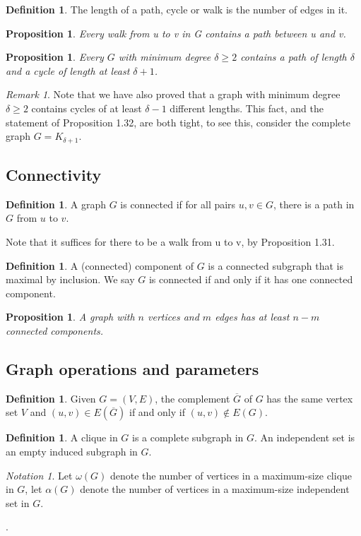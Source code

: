 \documentclass[10pt, fleqn, a4paper, landscape]{article}
\theoremstyle{plain} %
\newtheorem{pro}[thm]{Proposition}
\theoremstyle{remark} %
\newtheorem{rem}[thm]{Remark}
\newtheorem{nota}[thm]{Notation}
\theoremstyle{definition} %
\newtheorem{defi}[thm]{Definition}
\begin{document}
\begin{multicols}{3}
\begin{tiny}
\begin{defi}
The length of a path, cycle or walk is the number of edges in it.
\end{defi}
\addtocounter{thm}{1}
\begin{pro}
Every walk from u to v in G contains a path between u and v.
\end{pro}

\begin{pro}
Every $G$ with minimum degree $ \delta\ge 2$ contains a path of length $\delta$ and a cycle of length at least $\delta + 1$.
\end{pro}

\begin{rem}
Note that we have also proved that a graph with minimum degree $\delta\ge 2$ contains cycles of at least $\delta-1$ different lengths. This fact, and the statement of Proposition 1.32, are both tight, to see this, consider the complete graph $G = K_{\delta+1}$.
\end{rem} 

\subsection{Connectivity}

\begin{defi}
A graph $G$ is connected if for all pairs $u, v \in G$, there is a path in $G$ from $u$ to $v$.
\end{defi}
Note that it suffices for there to be a walk from u to v, by Proposition 1.31.
\addtocounter{thm}{1}
\begin{defi}
A (connected) component of $G$ is a connected subgraph that is maximal by inclusion. We say $G$ is connected if and only if it has one connected component.
\end{defi}
\addtocounter{thm}{1}
\begin{pro}
A graph with $n$ vertices and $m$ edges has at least $n-m$ connected components.
\end{pro}

\subsection{Graph operations and parameters}

\begin{defi}
Given $G = (V,E)$, the complement $\overline{G}$ of $G$ has the same vertex set $V$ and $(u, v) \in E(\overline{G})$ if and only if $(u, v) \notin E(G)$.
\end{defi}
\addtocounter{thm}{1}
\begin{defi}
A clique in $G$ is a complete subgraph in $G$. An independent set is an empty
induced subgraph in $G$.
\end{defi}
\addtocounter{thm}{1}
\begin{nota}
Let $\omega(G)$ denote the number of vertices in a maximum-size clique in $G$, let $\alpha(G)$ denote the number of vertices in a maximum-size independent set in $G$.
\end{nota}. 


\end{tiny}
\end{multicols}
\end{document}

